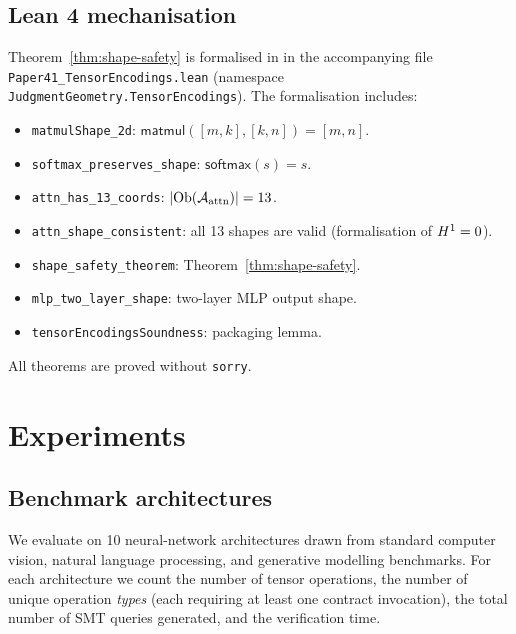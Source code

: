 \documentclass[11pt]{article}
\newcommand{\TMatmul}{\mathsf{matmul}}             %
\newcommand{\TSoftmax}{\mathsf{softmax}}           %
\newcommand{\AttnSite}{\mathcal{A}_{\mathrm{attn}}}%
\begin{document}
\subsection{Lean 4 mechanisation}

Theorem~\ref{thm:shape-safety} is formalised in \LEAN{} in the
accompanying file \texttt{Paper41\_TensorEncodings.lean} (namespace
\texttt{JudgmentGeometry.TensorEncodings}).  The formalisation
includes:

\begin{itemize}
\item \texttt{matmulShape\_2d}: $\TMatmul([m,k],[k,n]) = [m,n]$.
\item \texttt{softmax\_preserves\_shape}: $\TSoftmax(s) = s$.
\item \texttt{attn\_has\_13\_coords}: $|\Ob(\AttnSite)| = 13$.
\item \texttt{attn\_shape\_consistent}: all 13 shapes are valid
      (formalisation of $H^{1} = 0$).
\item \texttt{shape\_safety\_theorem}: Theorem~\ref{thm:shape-safety}.
\item \texttt{mlp\_two\_layer\_shape}: two-layer MLP output shape.
\item \texttt{tensorEncodingsSoundness}: packaging lemma.
\end{itemize}

All theorems are proved without \texttt{sorry}.

\section{Experiments}
\label{sec:exp}

\subsection{Benchmark architectures}

We evaluate \JuGeo{} on 10 neural-network architectures drawn from
standard computer vision, natural language processing, and generative
modelling benchmarks.  For each architecture we count the number of
tensor operations, the number of unique operation \emph{types}
(each requiring at least one contract invocation), the total number
of SMT queries generated, and the verification time.
\end{document}
